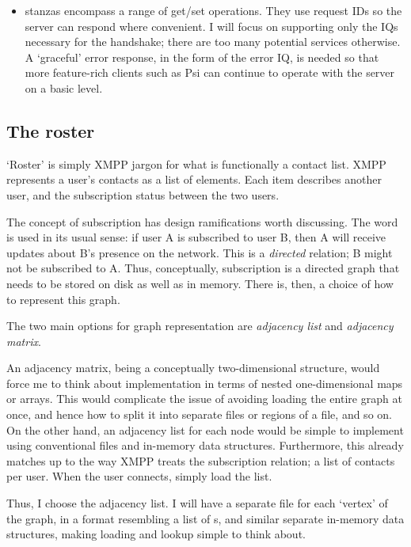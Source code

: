 \documentclass[12pt,a4paper,twoside,openright]{report}
\begin{document}
{\begin{itemize}
  \item {} stanzas encompass a range of get/set operations. They use request IDs so the server can respond where convenient. I will focus on supporting only the IQs necessary for the handshake; there are too many potential services otherwise. A `graceful' error response, in the form of the  error IQ, is needed so that more feature-rich clients such as Psi can continue to operate with the server on a basic level.
\end{itemize}

\subsection{The roster}\label{sec:prep-roster}
`Roster' is simply XMPP jargon for what is functionally a contact list. XMPP represents a user's contacts as a list of  elements. Each item describes another user, and the subscription status between the two users.

The concept of subscription has design ramifications worth discussing. The word is used in its usual sense: if user A is subscribed to user B, then A will receive updates about B's presence on the network. This is a \emph{directed} relation; B might not be subscribed to A. Thus, conceptually, subscription is a directed graph that needs to be stored on disk as well as in memory. There is, then, a choice of how to represent this graph.

The two main options for graph representation are \emph{adjacency list} and \emph{adjacency matrix}.

An adjacency matrix, being a conceptually two-dimensional structure, would force me to think about implementation in terms of nested one-dimensional maps or arrays. This would complicate the issue of avoiding loading the entire graph at once, and hence how to split it into separate files or regions of a file, and so on. On the other hand, an adjacency list for each node would be simple to implement using conventional files and in-memory data structures. Furthermore, this already matches up to the way XMPP treats the subscription relation; a list of contacts per user. When the user connects, simply load the list.

Thus, I choose the adjacency list. I will have a separate file for each `vertex' of the graph, in a format resembling a list of s, and similar separate in-memory data structures, making loading and lookup simple to think about.

}
\end{document}
